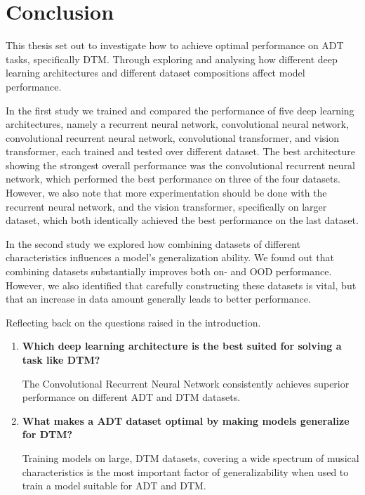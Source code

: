\chapter{Conclusion}\label{Conclusion}

This thesis set out to investigate how to achieve optimal performance on \acrfull{ADT} tasks, specifically \acrfull{DTM}. Through exploring and analysing how different deep learning architectures and different dataset compositions affect model performance. 

In the first study we trained and compared the performance of five deep learning architectures, namely a recurrent neural network, convolutional neural network, convolutional recurrent neural network, convolutional transformer, and vision transformer, each trained and tested over different dataset. The best architecture showing the strongest overall performance was the convolutional recurrent neural network, which performed the best performance on three of the four datasets. However, we also note that more experimentation should be done with the recurrent neural network, and the vision transformer, specifically on larger dataset, which both identically achieved the best performance on the last dataset.

In the second study we explored how combining datasets of different characteristics influences a model's generalization ability. We found out that combining datasets substantially improves both on- and \acrfull{OOD} performance. However, we also identified that carefully constructing these datasets is vital, but that an increase in data amount generally leads to better performance.

Reflecting back on the questions raised in the introduction.
\begin{enumerate}
    \item \textbf{Which deep learning architecture is the best suited for solving a task like \gls{DTM}?} 
    \par The Convolutional Recurrent Neural Network consistently achieves superior performance on different \gls{ADT} and \gls{DTM} datasets.
    \item \textbf{What makes a \gls{ADT} dataset optimal by making models generalize for \gls{DTM}?} 
    \par Training models on large, \gls{DTM} datasets, covering a wide spectrum of musical characteristics is the most important factor of generalizability when used to train a model suitable for \gls{ADT} and \gls{DTM}.
\end{enumerate}

